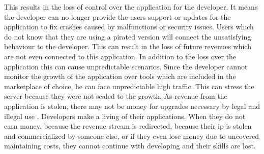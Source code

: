 This results in the loss of control over the application for the developer.
It means the developer can no longer provide the users support or updates for the application to fix crashes caused by malfunctions or security issues.
Users which do not know that they are using a pirated version will connect the unsatisfying behaviour to the developer.
This can result in the loss of future revenues which are not even connected to this application.
In addition to the loss over the application this can cause unpredictable scenarios.
Since the developer cannot monitor the growth of the application over tools which are included in the marketplace of choice, he can face unpredictable high traffic.
This can stress the server because they were not scaled to the growth.
As revenue from the application is stolen, there may not be money for upgrades necessary by legal and illegal use \cite{lierschDeveloperThreats}.
\newline
\newline
Developers make a living of their applications.
When they do not earn money, because the revenue stream is redirected, because their \gls{ip} is stolen and commercialized by someone else, or if they even lose money due to uncovered maintaining costs, they cannot continue with developing and their skills are lost.

